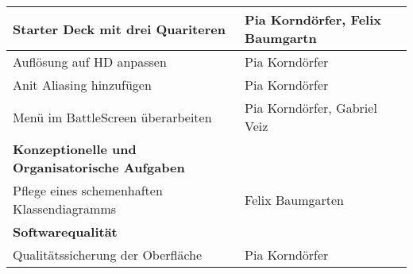 \begin{longtable}{|p{8cm}|p{10cm}|}
Starter Deck mit drei Quariteren & Pia Korndörfer, Felix Baumgartn \\ \hline
Auflösung auf HD anpassen & Pia Korndörfer \\ \hline
Anit Aliasing hinzufügen & Pia Korndörfer \\ \hline
Menü im BattleScreen überarbeiten & Pia Korndörfer, Gabriel Veiz \\ \hline
\textbf{Konzeptionelle und Organisatorische Aufgaben} & \\ \hline
Pflege eines schemenhaften Klassendiagramms  & Felix Baumgarten \\ \hline
\textbf{Softwarequalität} & \\
Qualitätssicherung der Oberfläche & Pia Korndörfer \\ \hline
\hline
\end{longtable}